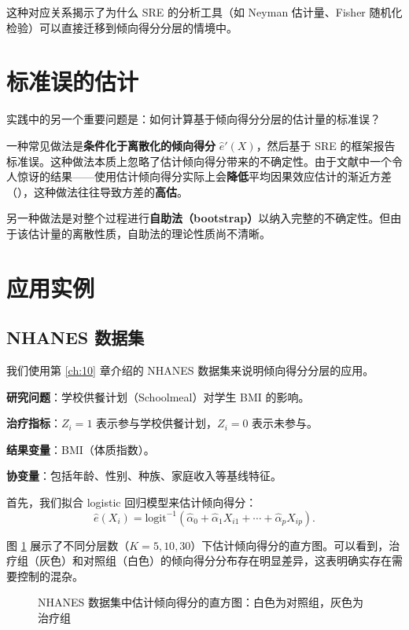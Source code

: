 这种对应关系揭示了为什么 SRE 的分析工具（如 Neyman 估计量、Fisher 随机化检验）可以直接迁移到倾向得分分层的情境中。

\section{标准误的估计}\label{sec:13-standard-error}

实践中的另一个重要问题是：如何计算基于倾向得分分层的估计量的标准误？

一种常见做法是\textbf{条件化于离散化的倾向得分} $\hat{e}'(X)$，然后基于 SRE 的框架报告标准误。这种做法本质上忽略了估计倾向得分带来的不确定性。由于文献中一个令人惊讶的结果——使用估计倾向得分实际上会\textbf{降低}平均因果效应估计的渐近方差（\citealp{SuEtAl:2023}），这种做法往往导致方差的\textbf{高估}。

另一种做法是对整个过程进行\textbf{自助法（bootstrap）}以纳入完整的不确定性。但由于该估计量的离散性质，自助法的理论性质尚不清晰。

\section{应用实例}\label{sec:13-application}

\subsection{NHANES 数据集}\label{sec:13-nhanes-example}

我们使用第 \ref{ch:10} 章介绍的 NHANES 数据集来说明倾向得分分层的应用。

\textbf{研究问题}：学校供餐计划（Schoolmeal）对学生 BMI 的影响。

\textbf{治疗指标}：$Z_i = 1$ 表示参与学校供餐计划，$Z_i = 0$ 表示未参与。

\textbf{结果变量}：BMI（体质指数）。

\textbf{协变量}：包括年龄、性别、种族、家庭收入等基线特征。

首先，我们拟合 logistic 回归模型来估计倾向得分：
\[
\hat{e}(X_i) = \text{logit}^{-1}(\hat{\alpha}_0 + \hat{\alpha}_1 X_{i1} + \cdots + \hat{\alpha}_p X_{ip}).
\]

图 \ref{fig:13-pscore-hist} 展示了不同分层数（$K = 5, 10, 30$）下估计倾向得分的直方图。可以看到，治疗组（灰色）和对照组（白色）的倾向得分分布存在明显差异，这表明确实存在需要控制的混杂。

\begin{figure}[htbp]
\centering
\caption{NHANES 数据集中估计倾向得分的直方图：白色为对照组，灰色为治疗组}\label{fig:13-pscore-hist}
\end{figure}

